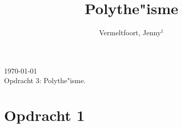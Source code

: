 \documentclass[10pt]{amsart}
\begin{document}
\setcounter{page}{1}

\hfill     {\small \today} \\
{\small Opdracht 3: Polythe"isme.}\hfill
{\small } %

\centerline{}

\centerline{}

\title[Polythe"isme]{Polythe"isme}

\author[J. Vermeltfoort]{Vermeltfoort, Jenny$^1$}

\address{$^{1}$ 3787494, Faculteit Geesteswetenschappen, Leiden
     Universiteit, Leiden, Nederland.}
\email{\textcolor[rgb]{0.00,0.00,0.84}{j.vermeltfoort@umail.leidenuniv.nl}}

\maketitle

\section*{Opdracht 1}

\noindent 


\newpage \printbibliography{}
\end{document}
